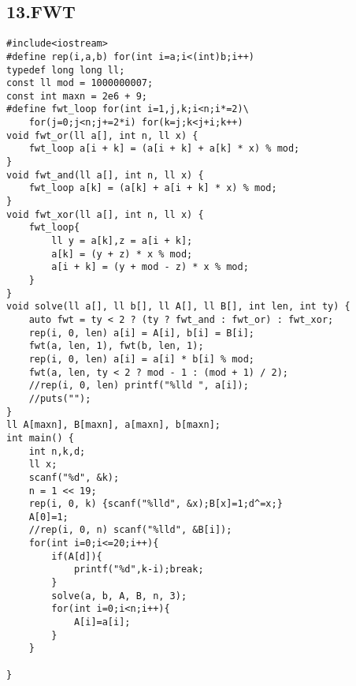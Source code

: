 \documentclass[]{article}
\begin{document}
\hypertarget{fwt}{%
\subsection{13.FWT}\label{fwt}}

\begin{verbatim}
#include<iostream>
#define rep(i,a,b) for(int i=a;i<(int)b;i++)
typedef long long ll;
const ll mod = 1000000007;
const int maxn = 2e6 + 9;
#define fwt_loop for(int i=1,j,k;i<n;i*=2)\
    for(j=0;j<n;j+=2*i) for(k=j;k<j+i;k++) 
void fwt_or(ll a[], int n, ll x) {
    fwt_loop a[i + k] = (a[i + k] + a[k] * x) % mod;
}
void fwt_and(ll a[], int n, ll x) {
    fwt_loop a[k] = (a[k] + a[i + k] * x) % mod;
}
void fwt_xor(ll a[], int n, ll x) {
    fwt_loop{
        ll y = a[k],z = a[i + k];
        a[k] = (y + z) * x % mod;
        a[i + k] = (y + mod - z) * x % mod;
    }
}
void solve(ll a[], ll b[], ll A[], ll B[], int len, int ty) {
    auto fwt = ty < 2 ? (ty ? fwt_and : fwt_or) : fwt_xor;
    rep(i, 0, len) a[i] = A[i], b[i] = B[i];
    fwt(a, len, 1), fwt(b, len, 1);
    rep(i, 0, len) a[i] = a[i] * b[i] % mod;
    fwt(a, len, ty < 2 ? mod - 1 : (mod + 1) / 2);
    //rep(i, 0, len) printf("%lld ", a[i]);
    //puts("");
}
ll A[maxn], B[maxn], a[maxn], b[maxn];
int main() {
    int n,k,d;
    ll x;
    scanf("%d", &k);
    n = 1 << 19;
    rep(i, 0, k) {scanf("%lld", &x);B[x]=1;d^=x;}
    A[0]=1;
    //rep(i, 0, n) scanf("%lld", &B[i]);
    for(int i=0;i<=20;i++){
        if(A[d]){
            printf("%d",k-i);break;
        }
        solve(a, b, A, B, n, 3);
        for(int i=0;i<n;i++){
            A[i]=a[i];
        }
    }
    
}
\end{verbatim}
\end{document}
